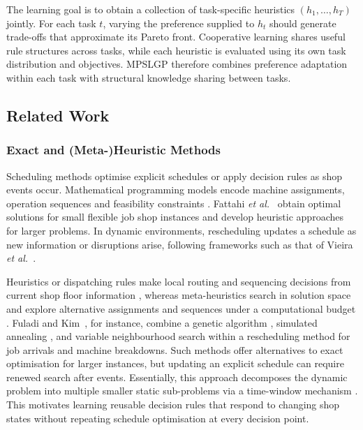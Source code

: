 \documentclass[10pt,journal]{IEEEtran}
\begin{document}
The learning goal is to obtain a collection of task-specific heuristics $(h_1,\ldots,h_T)$ jointly. For each task $t$, varying the preference supplied to $h_t$ should generate trade-offs that approximate its Pareto front. Cooperative learning shares useful rule structures across tasks, while each heuristic is evaluated using its own task distribution and objectives. MPSLGP therefore combines preference adaptation within each task with structural knowledge sharing between tasks.


\subsection{Related Work}
\subsubsection{Exact and (Meta-)Heuristic Methods}
Scheduling methods optimise explicit schedules or apply decision rules as shop events occur. Mathematical programming models encode machine assignments, operation sequences and feasibility constraints \cite{yao2024novel, roshanaei2013mathematical}. Fattahi \emph{et al.}~\cite{fattahi2007mathematical} obtain optimal solutions for small flexible job shop instances and develop heuristic approaches for larger problems. In dynamic environments, rescheduling updates a schedule as new information or disruptions arise, following frameworks such as that of Vieira \emph{et al.}~\cite{vieira2003rescheduling, wang2026self}.

Heuristics or dispatching rules make local routing and sequencing decisions from current shop floor information \cite{baker1983job}, whereas meta-heuristics search in solution space and explore alternative assignments and sequences under a computational budget \cite{lei2018two}. Fuladi and Kim~\cite{fuladi2024dynamic}, for instance, combine a genetic algorithm \cite{mirjalili2018genetic}, simulated annealing \cite{van1987simulated}, and variable neighbourhood search \cite{hansen2010variable} within a rescheduling method for job arrivals and machine breakdowns. Such methods offer alternatives to exact optimisation for larger instances, but updating an explicit schedule can require renewed search after events. Essentially, this approach decomposes the dynamic problem into multiple smaller static sub-problems via a time-window mechanism \cite{su2025decentralized, maenhout2024dynamic}. This motivates learning reusable decision rules that respond to changing shop states without repeating schedule optimisation at every decision point.
\end{document}
